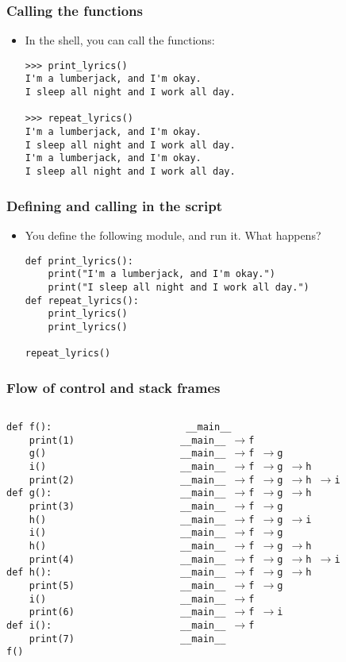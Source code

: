 \documentclass{beamer}
\newcommand{\bi}{\begin{itemize}}
\newcommand{\li}{\item}
\newcommand{\ei}{\end{itemize}}
\newcommand{\arrow}{\ensuremath{\rightarrow}}
\newcommand{\bfr}[1]{\begin{frame}[fragile]\frametitle{{ #1 }}}
\newcommand{\cola}{\begin{columns}\begin{column}{0.5\textwidth}}
\newcommand{\colb}{\end{column}\begin{column}{0.5\textwidth}}
\newcommand{\colc}{\end{column}\end{columns}}
\begin{document}
\bfr{Calling the functions}
\bi
\li In the shell, you can call the functions:
\begin{lstlisting}
>>> print_lyrics()
I'm a lumberjack, and I'm okay.
I sleep all night and I work all day.

>>> repeat_lyrics()
I'm a lumberjack, and I'm okay.
I sleep all night and I work all day.
I'm a lumberjack, and I'm okay.
I sleep all night and I work all day.
\end{lstlisting}

\ei
\end{frame}

\bfr{Defining and calling in the script}
\bi
\li You define the following module, and run it.  What happens?
\begin{lstlisting}
def print_lyrics():
    print("I'm a lumberjack, and I'm okay.")
    print("I sleep all night and I work all day.")    
def repeat_lyrics():
    print_lyrics()
    print_lyrics()
    
repeat_lyrics()
\end{lstlisting}

\ei
\end{frame}

\bfr{Flow of control and stack frames}
\small
\cola
\begin{lstlisting}
def f():
    print(1)
    g()
    i()
    print(2)
def g():
    print(3)
    h()
    i()
    h()
    print(4)
def h():
    print(5)
    i()
    print(6)
def i():
    print(7)    
f()
\end{lstlisting}

\colb
\pause

\begin{minipage}{\textwidth}
\tt
\_\_main\_\_  \\\pause
\_\_main\_\_ \arrow f\\\pause
\_\_main\_\_ \arrow f   \arrow g\\\pause
\_\_main\_\_ \arrow f   \arrow g \arrow  h\\\pause
\_\_main\_\_ \arrow f   \arrow g \arrow  h \arrow i\\\pause
\_\_main\_\_ \arrow f   \arrow g \arrow  h \\\pause
\_\_main\_\_ \arrow f   \arrow g \\\pause
\_\_main\_\_ \arrow f   \arrow g \arrow i\\\pause
\_\_main\_\_ \arrow f   \arrow g \\\pause
\_\_main\_\_ \arrow f   \arrow g \arrow  h\\\pause
\_\_main\_\_ \arrow f   \arrow g \arrow  h \arrow i\\\pause
\_\_main\_\_ \arrow f   \arrow g \arrow  h \\\pause
\_\_main\_\_ \arrow f   \arrow g  \\\pause
\_\_main\_\_ \arrow f   \\\pause
\_\_main\_\_ \arrow f   \arrow i\\\pause
\_\_main\_\_ \arrow f  \\\pause
\_\_main\_\_  \\
\end{minipage}
\colc
\end{frame}
\end{document}

